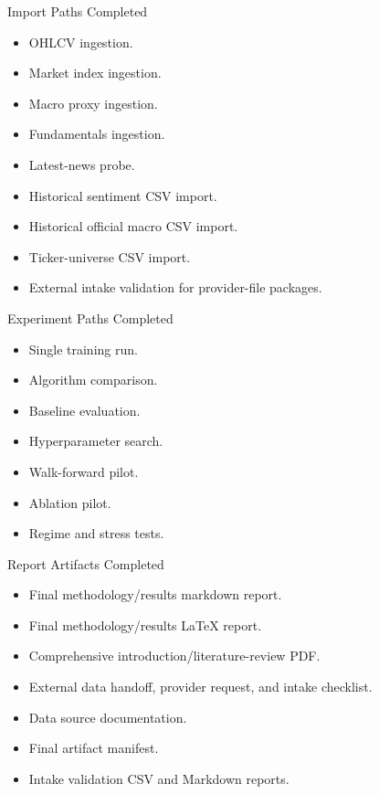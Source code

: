 \documentclass[aspectratio=43,10pt]{beamer}
\begin{document}
\begin{frame}{Import Paths Completed}
\begin{itemize}
  \item OHLCV ingestion.
  \item Market index ingestion.
  \item Macro proxy ingestion.
  \item Fundamentals ingestion.
  \item Latest-news probe.
  \item Historical sentiment CSV import.
  \item Historical official macro CSV import.
  \item Ticker-universe CSV import.
  \item External intake validation for provider-file packages.
\end{itemize}
\end{frame}

\begin{frame}{Experiment Paths Completed}
\begin{itemize}
  \item Single training run.
  \item Algorithm comparison.
  \item Baseline evaluation.
  \item Hyperparameter search.
  \item Walk-forward pilot.
  \item Ablation pilot.
  \item Regime and stress tests.
\end{itemize}
\end{frame}

\begin{frame}{Report Artifacts Completed}
\begin{itemize}
  \item Final methodology/results markdown report.
  \item Final methodology/results LaTeX report.
  \item Comprehensive introduction/literature-review PDF.
  \item External data handoff, provider request, and intake checklist.
  \item Data source documentation.
  \item Final artifact manifest.
  \item Intake validation CSV and Markdown reports.
\end{itemize}
\end{frame}
\end{document}
